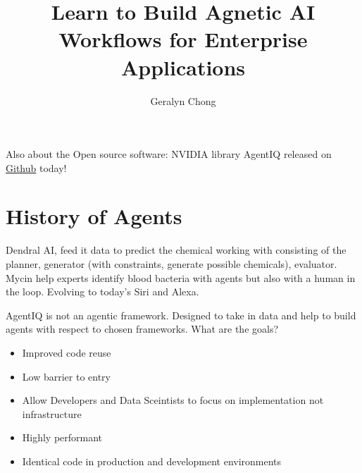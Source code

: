 \documentclass{article}
\title{Learn to Build Agnetic AI Workflows for Enterprise Applications}
\author{Geralyn Chong}
\begin{document}
\maketitle
\tableofcontents
Also about the Open source software: NVIDIA library AgentIQ released on \href{https://github.com/NVIDIA/AgentIQ}{Github} today!

\section{History of Agents}
Dendral AI, feed it data to predict the chemical working with consisting of the planner, generator (with constraints, generate possible chemicals), evaluator. Mycin help experts identify blood bacteria with agents but also with a human in the loop. Evolving to today's Siri and Alexa. 

AgentIQ is not an agentic framework. Designed to take in data and help to build agents with respect to chosen frameworks. What are the goals? \begin{itemize}
    \item Improved code reuse
    \item Low barrier to entry
    \item Allow Developers and Data Sceintists to focus on implementation not infrastructure
    \item Highly performant
    \item Identical code in production and development environments
\end{itemize}
\end{document}

